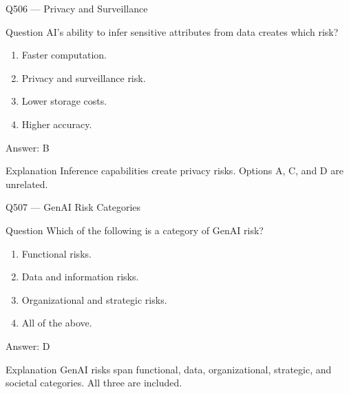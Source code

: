 \documentclass[aspectratio=169,8pt]{beamer}
\begin{document}
	\begin{frame}{Q506 --- Privacy and Surveillance}
		\begin{block}{Question}
			AI's ability to infer sensitive attributes from data creates which risk?
			\begin{enumerate}
				\item Faster computation.
				\item Privacy and surveillance risk.
				\item Lower storage costs.
				\item Higher accuracy.
			\end{enumerate}
		\end{block}
		\begin{exampleblock}{Answer: B}\end{exampleblock}
		\begin{block}{Explanation}
			Inference capabilities create privacy risks. Options A, C, and D are unrelated.
		\end{block}
	\end{frame}
	
	\begin{frame}{Q507 --- GenAI Risk Categories}
		\begin{block}{Question}
			Which of the following is a category of GenAI risk?
			\begin{enumerate}
				\item Functional risks.
				\item Data and information risks.
				\item Organizational and strategic risks.
				\item All of the above.
			\end{enumerate}
		\end{block}
		\begin{exampleblock}{Answer: D}\end{exampleblock}
		\begin{block}{Explanation}
			GenAI risks span functional, data, organizational, strategic, and societal categories. All three are included.
		\end{block}
	\end{frame}
	
\end{document}
